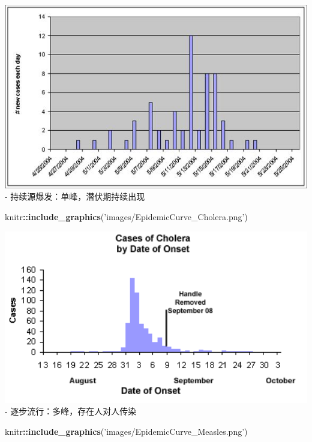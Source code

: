 \documentclass[]{book}
\newenvironment{Shaded}{\begin{snugshade}}{\end{snugshade}}
\newcommand{\KeywordTok}[1]{\textcolor[rgb]{0.13,0.29,0.53}{\textbf{#1}}}
\newcommand{\NormalTok}[1]{#1}
\newcommand{\OperatorTok}[1]{\textcolor[rgb]{0.81,0.36,0.00}{\textbf{#1}}}
\newcommand{\StringTok}[1]{\textcolor[rgb]{0.31,0.60,0.02}{#1}}
\begin{document}
\begin{Shaded}
\end{Shaded}

\includegraphics{images/epidemic curve.jpg}
- 持续源爆发：单峰，潜伏期持续出现

\begin{Shaded}
\begin{Highlighting}[]
\NormalTok{knitr}\OperatorTok{::}\KeywordTok{include_graphics}\NormalTok{(}\StringTok{'images/EpidemicCurve_Cholera.png'}\NormalTok{)}
\end{Highlighting}
\end{Shaded}

\includegraphics[width=5.5in]{images/EpidemicCurve_Cholera}
- 逐步流行：多峰，存在人对人传染

\begin{Shaded}
\begin{Highlighting}[]
\NormalTok{knitr}\OperatorTok{::}\KeywordTok{include_graphics}\NormalTok{(}\StringTok{'images/EpidemicCurve_Measles.png'}\NormalTok{)}
\end{Highlighting}
\end{Shaded}
\end{document}
